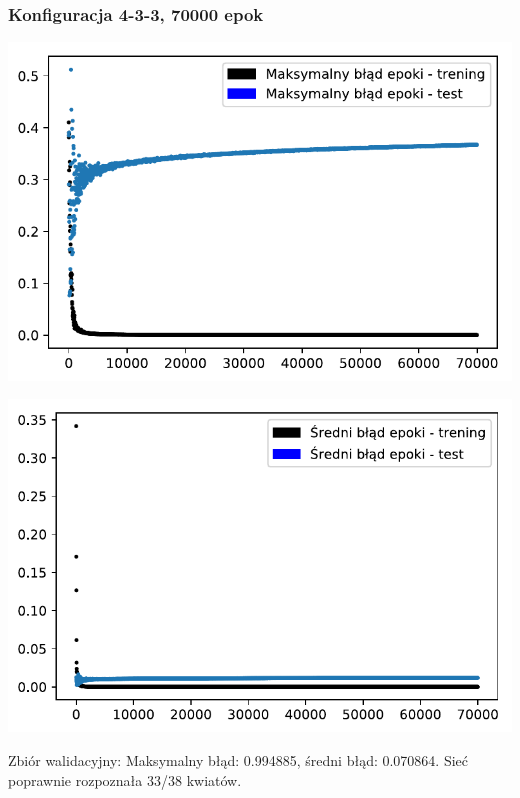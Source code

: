 \documentclass{classrep}
\begin{document}
\subsubsection{Konfiguracja 4-3-3, 70000 epok}
\begin{center}
  \includegraphics{output_0_0.pdf}
\end{center}
\begin{center}
  \includegraphics{output_0_1.pdf}
\end{center}

Zbiór walidacyjny: Maksymalny błąd: 0.994885, średni błąd: 0.070864.
Sieć poprawnie rozpoznała 33/38 kwiatów.
\end{document}

